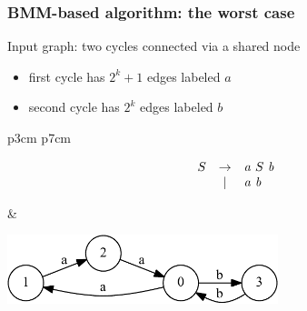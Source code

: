 \documentclass[xcolor=table]{beamer}
\begin{document}
\begin{frame}[fragile]
  \frametitle{BMM-based algorithm: the worst case}

Input graph: two cycles connected via a shared node

\begin{itemize}
	\item first cycle has $2^k + 1$ edges labeled $a$
	\item second cycle has $2^k$ edges labeled $b$
\end{itemize}


\begin{tabular}{p{3cm} p{7cm} }
\begin{figure}[h]
	\[
	\begin{array}{ccl}
	S & \rightarrow & \text{\emph{a}} \ S \ \text{\emph{b}} \\
	  & |           & \text{\emph{a}} \ \text{\emph{b}} \\
	\end{array}
	\]

\end{figure}

&

\begin{center}
  \includegraphics[height=2cm]{pictures/example_graph.pdf}
\end{center}
  \end{tabular}
\end{frame}
\end{document}
